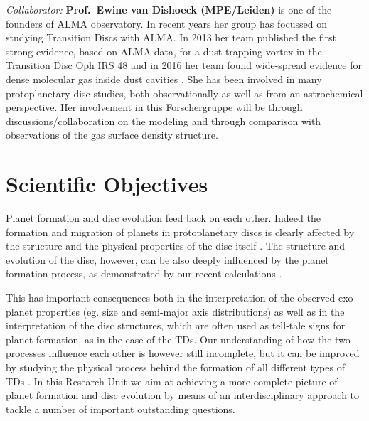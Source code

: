 \documentclass[10pt,fleqn,twoside]{article}
\begin{document}
{\it Collaborator:} {\bf Prof.\ Ewine van Dishoeck (MPE/Leiden)}
is one of the founders of ALMA observatory. In recent years her group
has focussed on studying Transition Discs with ALMA. In 2013 her team
published the first strong evidence, based on ALMA data, for a
dust-trapping vortex in the Transition Disc Oph IRS 48 \citep{2013Sci...340.1199V}
and in 2016 her team found wide-spread
 evidence for dense molecular gas inside dust cavities \citep{2016A&A...585A..58V}. 
She has been
involved in many protoplanetary disc studies, both observationally as
well as from an astrochemical perspective. Her involvement in this Forschergruppe
will be through discussions/collaboration on the modeling and through comparison with
 observations of the gas surface density structure.\\


\section{Scientific Objectives}

Planet formation and disc evolution feed back on each other. Indeed
the formation and migration of planets in protoplanetary discs is
clearly affected by the structure and the physical properties of the
disc itself \citep[e.g.][to cite only a few of the works coming from our team]{2016arXiv161101070D, 2015MNRAS.450.3008E}. 
The
structure and evolution of the disc, however, can be also deeply
influenced by the planet formation process, as demonstrated by our
recent calculations \citep[e.g.,][]{2013MNRAS.430.1392R, 2015MNRAS.454.2173R}.

This has important consequences both in the interpretation of the observed
exo-planet properties (eg. size and semi-major axis distributions) as
well as in the interpretation of the disc structures, which are often
used as tell-tale signs for planet formation, as in the case of the
TDs. Our understanding of how the two processes
influence each other is however still incomplete, but it can be
improved by studying the physical process behind the formation of all
different types of TDs . 
In this Research Unit we aim at achieving a more complete picture of
planet formation and disc evolution by means of an interdisciplinary
approach to tackle a number of important outstanding questions. 
\\
\end{document}
